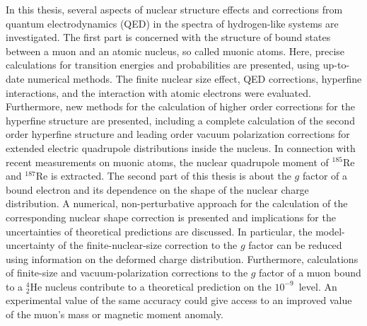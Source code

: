 
{\small
In this thesis, several aspects of nuclear structure effects and corrections from quantum electrodynamics (QED) in the spectra of hydrogen-like systems are investigated. 
The first part is concerned with the structure of bound states between a muon and an atomic nucleus, so called muonic atoms. Here, precise calculations for transition energies and probabilities are presented, using up-to-date numerical methods. The finite nuclear size effect, QED corrections, hyperfine interactions, and the interaction with atomic electrons were evaluated. 
Furthermore, new methods for the calculation of higher order corrections for the hyperfine structure are presented, including a complete calculation of the second order hyperfine structure and leading order vacuum polarization corrections for extended electric quadrupole distributions inside the nucleus. 
In connection with recent measurements on muonic atoms, the nuclear quadrupole moment of $^{185}$Re and $^{187}$Re is extracted.
The second part of this thesis is about the $g$ factor of a bound electron and its dependence on the shape of the nuclear charge distribution. 
A numerical, non-perturbative approach for the calculation of the corresponding nuclear shape correction is presented and implications for the uncertainties of theoretical predictions are discussed. In particular, the model-uncertainty of the finite-nuclear-size correction to the $g$ factor can be reduced using information on the deformed charge distribution.
Furthermore, calculations of finite-size and vacuum-polarization corrections to the $g$ factor of a muon bound to a $^{4}_2$He nucleus contribute to a theoretical prediction on the $10^{-9}$~level. An experimental value of the same accuracy could give access to an improved value of the muon's mass or magnetic moment anomaly.
}

\thispagestyle{empty}
